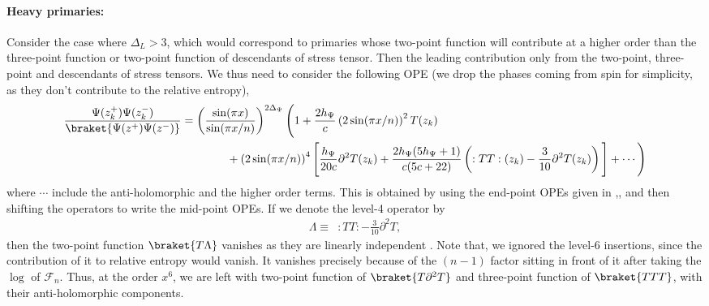 \documentclass[11pt]{article}
\newcommand{\p}{\partial}
\newcommand{\nn}{\nonumber}
\newcommand{\lb}{\left(}
\newcommand{\rb}{\right)}
\begin{document}
\paragraph{Heavy primaries:}
Consider the case where $\Delta_L>3$, which would correspond to primaries whose two-point function will contribute at a higher order than the three-point function or two-point function of descendants of stress tensor. Then the leading contribution only from the two-point, three-point and descendants of stress tensors. We thus need to consider the following OPE (we drop the phases coming from spin for simplicity, as they don't contribute to the relative entropy),
\begin{align}
    \frac{\Psi(z_k^+) \Psi(z_k^-)}{\braket{\Psi(z^+) \Psi(z^-)}} &= \lb\frac{\sin(\pi x)}{\sin(\pi x/n)}\rb^{2\Delta_\Psi} \Bigg(1+ \frac{2h_\Psi}{c} \lb 2\sin (\pi x/n)\rb^2 T(z_k) \nn\\
    &\qquad\qquad  + \lb 2\sin (\pi x/n)\rb^4\Bigg[\frac{h_\Psi}{20c}\p^2T(z_k) + \frac{2h_\Psi(5h_\Psi+1)}{c(5c+22)}\lb :TT:(z_k) - \frac{3}{10}\p^2T(z_k)\rb\Bigg] + \cdots \Bigg)
\end{align}
where $\cdots$ include the anti-holomorphic and the higher order terms. This is obtained by using the end-point OPEs given in \cite{Zamolodchikov:1985wn},\cite{Mathieu_2007}, and then shifting the operators to write the mid-point OPEs. If we denote the level-4 operator by
\begin{align}
    \Lambda  \equiv \,\,\, :TT: - \frac{3}{10}\p^2T,
\end{align}
then the two-point function $\braket{T\Lambda}$ vanishes as they are linearly independent \cite{Chen_2014}. Note that, we ignored the level-6 insertions, since the contribution of it to relative entropy would vanish. It vanishes precisely because of the $(n-1)$ factor sitting in front of it after taking the $\log$ of $\mathcal{F}_n$. Thus, at the order $x^6$, we are left with two-point function of $\braket{T \p^2 T}$ and three-point function of $\braket{TTT}$, with their anti-holomorphic components. 
\end{document}
